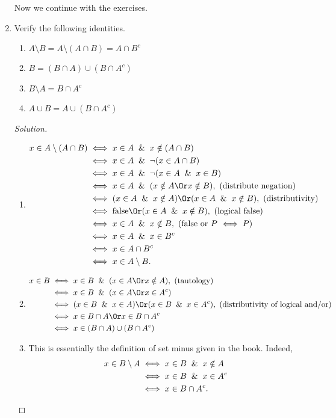 \documentclass[12pt]{article}
\theoremstyle{definition}
\theoremstyle{plain}
\newenvironment{solution}
  {\begin{proof}[Solution]}
  {\end{proof}}
\begin{document}
\begin{enumerate}
Now we continue with the exercises.
\item Verify the following identities.
	\begin{enumerate}
	\item $ A \setminus B = A \setminus (A \cap B) = A \cap B^c $
	\item $ B = (B \cap A) \cup (B \cap A^c) $
	\item $ B \setminus A = B \cap A^c $
	\item $ A \cup B = A \cup (B \cap A^c) $
	\end{enumerate}
	\begin{solution}
	\begin{enumerate}
	\item \begin{align*}
		x \in A \setminus (A \cap B) & \iff x \in A \And x \notin (A \cap B)\\
		&\iff x \in A \And \neg (x \in A \cap B)\\
		&\iff x \in A \And \neg (x \in A \And x \in B)\\
		&\iff x \in A \And (x \notin A \Or x \notin B) , \text{ (distribute negation)}\\
		&\iff (x \in A \And x \notin A) \Or (x \in A \And x \notin B), \text{ (distributivity)}\\
		&\iff \text{false} \Or (x \in A \And x \notin B), \text{ (logical false)}\\
		&\iff x \in A \And x \notin B, \text{ (false or $P$ $\iff P$)} \\
		&\iff x \in A \And x \in B^c\\
		&\iff x \in A \cap B^c\\
		&\iff x \in A \setminus B.
	\end{align*}
	\item \begin{align*}
			x \in B & \iff x \in B \And (x \in A \Or x \notin A), \text{ (tautology)}\\
			&\iff x \in B \And (x \in A \Or x \in A^c)\\
			&\iff (x \in B \And x \in A) \Or (x \in B \And x \in A^c), \text{ (distributivity of logical and/or)}\\
			&\iff x \in B \cap A \Or x \in B \cap A^c\\
			&\iff x \in (B \cap A) \cup (B \cap A^c)
		\end{align*}
	\item This is essentially the definition of set minus given in the book. Indeed, 
		\begin{align*}
			x \in B \setminus A & \iff x \in B \And x \notin A\\
			& \iff x \in B \And x \in A^c\\
			& \iff x \in B \cap A^c.
		\end{align*}
		

\end{enumerate}
\end{solution}
\end{enumerate}
\end{document}
